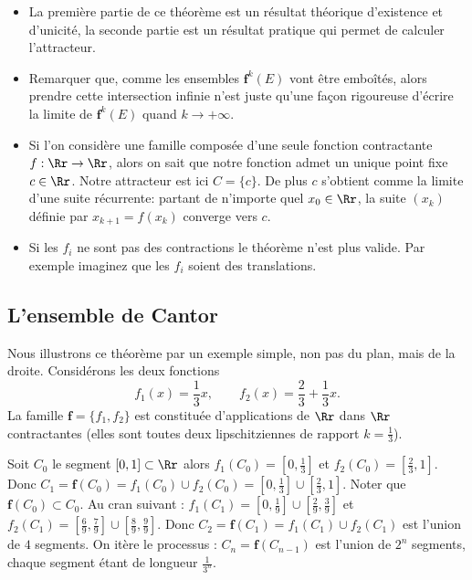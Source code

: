 \documentclass[11pt,class=report,crop=false]{standalone}
\newcommand{\commentfigure}[1]{#1} %
\begin{document}
\begin{remarque*}
\sauteligne
\begin{itemize}

 \item La première partie de ce théorème est un résultat théorique d'existence et d'unicité,
la seconde partie est un résultat pratique qui permet de calculer l'attracteur.


  \item Remarquer que, comme les ensembles $\mathbf{f}^k(E)$ vont être emboîtés, 
alors prendre cette intersection infinie n'est juste qu'une façon rigoureuse d'écrire la limite de $\mathbf{f}^k(E)$ quand $k\to +\infty$.

 \item Si l'on considère une famille composée d'une seule fonction contractante $f : \Rr \to \Rr$,
alors on sait que notre fonction admet un unique point fixe $c\in \Rr$. Notre attracteur est ici $C=\{c\}$.
De plus $c$ s'obtient comme la limite d'une suite récurrente: partant de n'importe quel $x_0 \in \Rr$,
la suite $(x_k)$ définie par $x_{k+1}= f(x_k)$ converge vers $c$.

 \item Si les $f_i$ ne sont pas des contractions le théorème n'est plus valide. Par exemple
imaginez que les $f_i$ soient des translations.
\end{itemize}
\end{remarque*}






\subsection{L'ensemble de Cantor}




Nous illustrons ce théorème par un exemple simple, 
non pas du plan, mais de la droite.
Considérons les deux fonctions
$$f_1(x)=\frac 13x, \qquad f_2(x)=\frac 23 + \frac 13x.$$
La famille $\mathbf{f}=\{f_1,f_2\}$ est constituée d'applications 
de $\Rr$ dans $\Rr$ contractantes (elles sont toutes deux
lipschitziennes de rapport $k=\frac 13$).

\commentfigure{
}

Soit $C_0$ le segment $[0,1] \subset \Rr$ alors
$f_1(C_0)=[0,\frac 13]$ et $f_2(C_0) = [\frac 23, 1]$.
Donc $C_1 = \mathbf{f}(C_0) = f_1(C_0)\cup f_2(C_0) = [0,\frac 13] \cup [\frac 23, 1]$. Noter que $\mathbf{f}(C_0) \subset C_0$.
Au cran suivant :
$f_1(C_1) = [0,\frac 19] \cup [\frac 29,\frac 39]$
et $f_2(C_1) = [\frac69,\frac 79] \cup [\frac 89,\frac 99]$.
Donc $C_2 = \mathbf{f}(C_1) = f_1(C_1) \cup f_2(C_1)$ est l'union de $4$ segments.
On itère le processus :
$C_n= \mathbf{f}(C_{n-1})$ est l'union de $2^n$ segments, 
chaque segment étant de longueur $\frac{1}{3^n}$.
\end{document}
